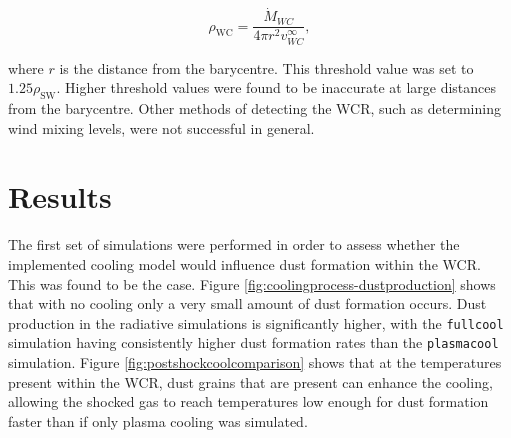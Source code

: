 \documentclass[fleqn,usenatbib]{mnras}
\begin{document}
\begin{equation}
  \rho_\text{WC} = \frac{\dot{M}_{WC}}{4 \pi r^2 v^\infty_{WC}},
\end{equation}

\noindent
where $r$ is the distance from the barycentre.
This threshold value was set to $1.25\rho_\text{SW}$.
Higher threshold values were found to be inaccurate at large distances from the barycentre.
Other methods of detecting the WCR, such as determining wind mixing levels, were not successful in general.


\section{Results}
\label{sec:p1-results}

The first set of simulations were performed in order to assess whether the implemented cooling model would influence dust formation within the WCR.
This was found to be the case.
Figure \ref{fig:coolingprocess-dustproduction} shows that with no cooling only a very small amount of dust formation occurs.
Dust production in the radiative simulations is significantly higher, with the \texttt{fullcool} simulation having consistently higher dust formation rates than the \texttt{plasmacool} simulation.
Figure \ref{fig:postshockcoolcomparison} shows that at the temperatures present within the WCR, dust grains that are present can enhance the cooling, allowing the shocked gas to reach temperatures low enough for dust formation faster than if only plasma cooling was simulated.
\end{document}
